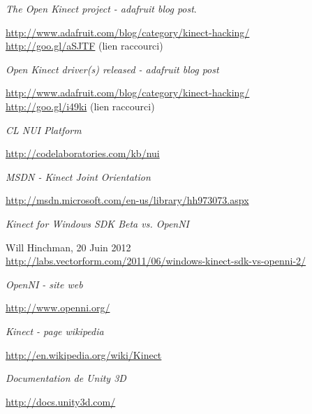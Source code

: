 \begin{thebibliography}{200}
\begin{footnotesize}
  \emph{The Open Kinect project - adafruit blog post}. \\
  \begin{tiny}
  \url{http://www.adafruit.com/blog/category/kinect-hacking/}\\
  \url{http://goo.gl/aSJTF} (lien raccourci)
  \end{tiny}

  \emph{Open Kinect driver(s) released - adafruit blog post}\\
  \begin{tiny}
  \url{http://www.adafruit.com/blog/category/kinect-hacking/}\\
  \url{http://goo.gl/i49ki} (lien raccourci)
  \end{tiny}

  \emph{CL NUI Platform}\\
  \begin{tiny}
  \url{http://codelaboratories.com/kb/nui}
  \end{tiny}
  
  \emph{MSDN - Kinect Joint Orientation}\\
  \begin{tiny}
  \url{http://msdn.microsoft.com/en-us/library/hh973073.aspx}
  \end{tiny}
  
  \emph{Kinect for Windows SDK Beta vs. OpenNI}\\
  \begin{tiny}
  Will Hinchman, 20 Juin 2012\\
  \url{http://labs.vectorform.com/2011/06/windows-kinect-sdk-vs-openni-2/}
  \end{tiny}

  \emph{OpenNI - site web}\\
  \begin{tiny}
  \url{http://www.openni.org/}
  \end{tiny}
  
  \emph{Kinect - page wikipedia}\\
  \begin{tiny}
  \url{http://en.wikipedia.org/wiki/Kinect}
  \end{tiny}
  
  \emph{Documentation de Unity 3D}\\
  \begin{tiny}
  \url{http://docs.unity3d.com/}
  \end{tiny}
  

\end{footnotesize}
\end{thebibliography}
